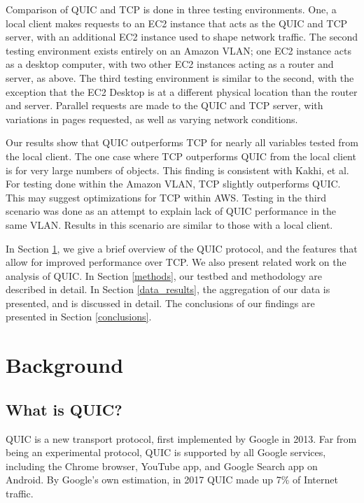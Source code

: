 \documentclass[12pt]{article}
\begin{document}
Comparison of QUIC and TCP is done in three testing environments. One, a local client makes requests to an EC2 instance that acts as the QUIC and TCP server, with an additional EC2 instance used to shape network traffic. The second testing environment exists entirely on an Amazon VLAN; one EC2 instance acts as a desktop computer, with two other EC2 instances acting as a router and server, as above. The third testing environment is similar to the second, with the exception that the EC2 Desktop is at a different physical location than the router and server. Parallel requests are made to the QUIC and TCP server, with variations in pages requested, as well as varying network conditions.

Our results show that QUIC outperforms TCP for nearly all variables tested from the local client. The one case where TCP outperforms QUIC from the local client is for very large numbers of objects. This finding is consistent with Kakhi, et al. For testing done within the Amazon VLAN, TCP slightly outperforms QUIC. This may suggest optimizations for TCP within AWS. Testing in the third scenario was done as an attempt to explain lack of QUIC performance in the same VLAN. Results in this scenario are similar to those with a local client.

In Section \ref{background}, we give a brief overview of the QUIC protocol, and the features that allow for improved performance over TCP. We also present related work on the analysis of QUIC. In Section \ref{methods}, our testbed and methodology are described in detail. In Section \ref{data_results}, the aggregation of our data is presented, and is discussed in detail. The conclusions of our findings are presented in Section \ref{conclusions}.

\section{Background}
\label{background}

\subsection{What is QUIC?}
\label{background:quic}

QUIC is a new transport protocol, first implemented by Google in 2013. Far from being an experimental protocol, QUIC is supported by all Google services, including the Chrome browser, YouTube app, and Google Search app on Android\cite{Langley:2017:QTP:3098822.3098842}. By Google's own estimation, in 2017 QUIC made up 7\% of Internet traffic\cite{Langley:2017:QTP:3098822.3098842}.
\end{document}
